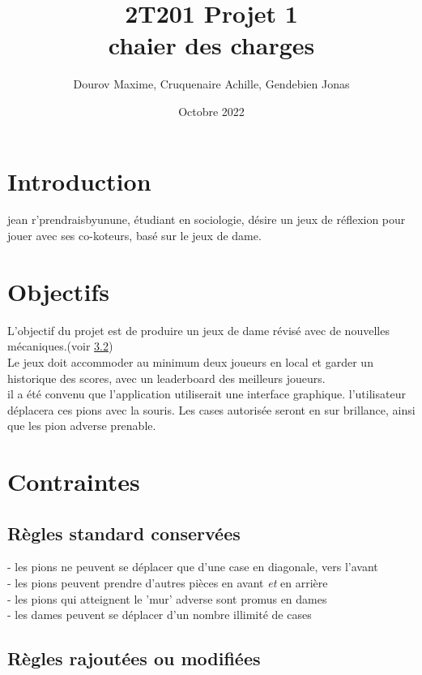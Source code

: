 \documentclass{article}
\title{2T201 Projet 1\\chaier des charges}
\author{Dourov Maxime, Cruquenaire Achille, Gendebien Jonas}
\date{Octobre 2022}
\begin{document}
\maketitle
\section{Introduction}
    jean r'prendraisbyunune, étudiant en sociologie,
    désire un jeux de réflexion pour jouer avec ses co-koteurs, basé sur le jeux de dame.
    

\section{Objectifs}
L'objectif du projet est de produire un jeux de dame révisé avec de nouvelles mécaniques.(voir \ref{new_rules})\\
Le jeux doit accommoder au minimum deux joueurs en local et garder un historique des scores, avec un leaderboard des meilleurs joueurs.\\
il a été convenu que l'application utiliserait une interface graphique. l'utilisateur déplacera ces pions avec la souris. Les cases autorisée seront en sur brillance, ainsi que les pion adverse prenable.

\section{Contraintes}
\subsection{Règles standard conservées}
- les pions ne peuvent se déplacer que d'une case en diagonale, vers l'avant\\
- les pions peuvent prendre d'autres pièces en avant \textit{et} en arrière\\
- les pions qui atteignent le 'mur' adverse sont promus en dames\\
- les dames peuvent se déplacer d'un nombre illimité de cases

\subsection{Règles rajoutées ou modifiées}\label{new_rules}
\end{document}
